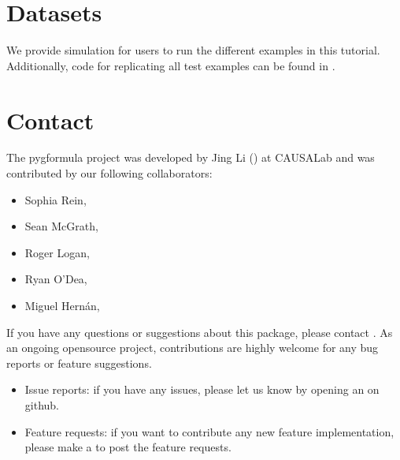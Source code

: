 \documentclass[letterpaper,10pt,english]{sphinxmanual}
\begin{document}
\chapter{Datasets}
\label{\detokenize{Datasets:datasets}}\label{\detokenize{Datasets::doc}}
\sphinxAtStartPar
We provide simulation  for
users to run the different examples in this tutorial.
Additionally, code for replicating all test examples can be found in .


\chapter{Contact}
\label{\detokenize{Contact:contact}}\label{\detokenize{Contact::doc}}
\sphinxAtStartPar
The pygformula project was developed by Jing Li () at CAUSALab and was contributed by our following collaborators:
\begin{itemize}
\item {} 
\sphinxAtStartPar
Sophia Rein, 

\item {} 
\sphinxAtStartPar
Sean McGrath, 

\item {} 
\sphinxAtStartPar
Roger Logan, 

\item {} 
\sphinxAtStartPar
Ryan O’Dea, 

\item {} 
\sphinxAtStartPar
Miguel Hernán, 

\end{itemize}

\sphinxAtStartPar
If you have any questions or suggestions about this package, please contact .
As an ongoing open\sphinxhyphen{}source project, contributions are highly welcome for any bug reports or
feature suggestions.
\begin{itemize}
\item {} 
\sphinxAtStartPar
Issue reports: if you have any issues, please let us know by opening an 
on github.

\item {} 
\sphinxAtStartPar
Feature requests: if you want to contribute any new feature implementation, please make a
 to post the feature requests.

\end{itemize}
\end{document}
